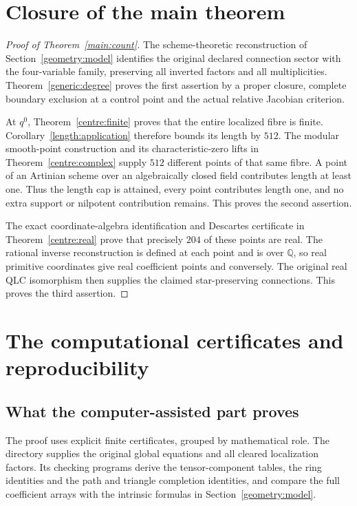 \documentclass[11pt,a4paper]{article}
\theoremstyle{remark}\newtheorem{remark}[theorem]{Remark}
\begin{document}
\section{Closure of the main theorem}
\begin{proof}[Proof of Theorem~\ref{main:count}]
The scheme-theoretic reconstruction of Section~\ref{geometry:model}
identifies the original declared connection sector with the four-variable
family, preserving all inverted factors and all multiplicities.
Theorem~\ref{generic:degree} proves the first assertion by a proper
closure, complete boundary exclusion at a control point and the actual
relative Jacobian criterion.

At $q^0$, Theorem~\ref{centre:finite} proves that the entire localized
fibre is finite. Corollary~\ref{length:application} therefore bounds its
length by $512$. The modular smooth-point construction and its
characteristic-zero lifts in Theorem~\ref{centre:complex} supply $512$
different points of that same fibre. A point of an Artinian scheme
over an algebraically closed field contributes length at least one.
Thus the length cap is attained, every point contributes length one,
and no extra support or nilpotent contribution remains. This proves
the second assertion.

The exact coordinate-algebra identification and Descartes certificate
in Theorem~\ref{centre:real} prove that precisely $204$ of these points
are real. The rational inverse reconstruction is defined at each point
and is over $\mathbb Q$, so real primitive coordinates give real
coefficient points and conversely. The original real QLC isomorphism
then supplies the claimed star-preserving connections. This proves
the third assertion.
\end{proof}

\section{The computational certificates and reproducibility}
\label{verification:section}

\subsection{What the computer-assisted part proves}
The proof uses explicit finite certificates, grouped by mathematical role.
The directory  supplies the original global
equations and all cleared localization factors. Its checking programs
derive the tensor-component tables, the ring identities and the path and
triangle completion identities, and compare the full coefficient arrays
with the intrinsic formulas in Section~\ref{geometry:model}.
\end{document}
